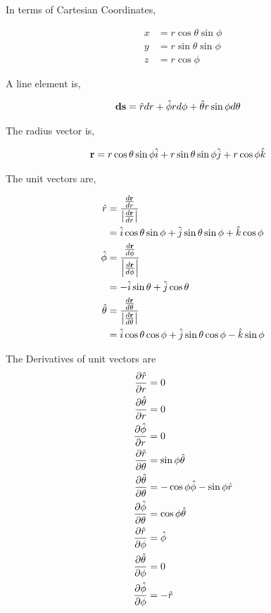 \documentclass[11pt]{article}
\begin{document}
In terms of Cartesian Coordinates,

\begin{align}
  \label{eq:sp2carOAt}
  x &= r\cos{\theta}\sin{\phi} \\
  y &= r\sin{\theta}\sin{\phi} \\
  z &= r\cos{\phi}
\end{align}

A line element is,

\begin{align}
  \vb{ds} &= \hat{r}dr + \hat{\phi} rd\phi + \hat{\theta} r\sin{\phi}d\theta
\end{align}

The radius vector is,

\begin{align}
  \vb{r} &= r\cos{\theta}\sin{\phi}\hat{i} + r\sin{\theta}\sin{\phi}\hat{j} + r\cos{\phi}\hat{k}
\end{align}

The unit vectors are,

\begin{align}
  \hat{r} &= \frac{\frac{d\vb{r}}{dr}}{\abs{\frac{d\vb{r}}{dr}}} \\
          &= \hat{i}\cos\theta\sin\phi + \hat{j}\sin\theta\sin\phi + \hat{k}\cos\phi \\
  \hat{\phi} &= \frac{\frac{d\vb{r}}{d\phi}}{\abs{\frac{d\vb{r}}{d\phi}}} \\
          &= -\hat{i}\sin\theta + \hat{j}\cos\theta \\
  \hat{\theta} &= \frac{\frac{d\vb{r}}{d\theta}}{\abs{\frac{d\vb{r}}{d\theta}}} \\
          &= \hat{i}\cos\theta\cos\phi + \hat{j}\sin\theta\cos\phi - \hat{k}\sin\phi
\end{align}

The Derivatives of unit vectors are
\begin{align}
  \pdv{\hat{r}}{r} &= 0\\
  \pdv{\hat\theta}{r} &= 0\\
  \pdv{\hat\phi}{r} & = 0 \\
  \pdv{\hat{r}}{\theta} &= \sin\phi \hat\theta \\
  \pdv{\hat\theta}{\theta} &= -\cos\phi\hat\phi - \sin\phi\hat r \\
  \pdv{\hat\phi}{\theta} &= \cos\phi\hat\theta \\
  \pdv{\hat{r}}{\phi}  &= \hat\phi \\
  \pdv{\hat\theta}{\phi} &= 0 \\
  \pdv{\hat\phi}{\phi} &= -\hat r                                          
\end{align}
\end{document}
